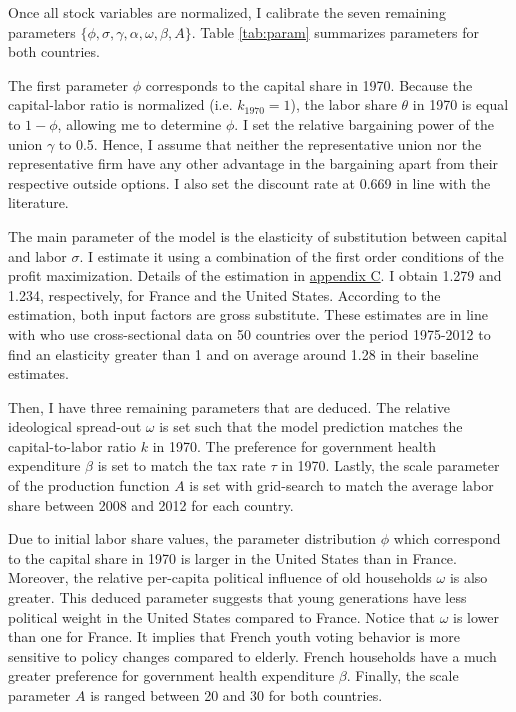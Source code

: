 Once all stock variables are normalized, I calibrate the seven remaining parameters $\lbrace \phi, \sigma, \gamma, \alpha, \omega, \beta, A \rbrace$. Table \ref{tab:param} summarizes parameters for both countries.

The first parameter $\phi$ corresponds to the capital share in 1970. Because the capital-labor ratio is normalized (i.e. $k_{1970} = 1$), the labor share $\theta$ in 1970 is equal to $1-\phi$, allowing me to determine $\phi$. I set the relative bargaining power of the union $\gamma$ to 0.5. Hence, I assume that neither the representative union nor the representative firm have any other advantage in the bargaining apart from their respective outside options. I also set the discount rate at 0.669 in line with the literature.

The main parameter of the model is the elasticity of substitution between capital and labor $\sigma$. I estimate it using a combination of the first order conditions of the profit maximization. Details of the estimation in \hyperref[appendix:sigma]{appendix C}. I obtain 1.279 and 1.234, respectively, for France and the United States. According to the estimation, both input factors are gross substitute. These estimates are in line with \cite{Karabarbounis2014} who use cross-sectional data on 50 countries over the period 1975-2012 to find an elasticity greater than 1 and on average around 1.28 in their baseline estimates. 

Then, I have three remaining parameters that are deduced. The relative ideological spread-out $\omega$ is set such that the model prediction matches the capital-to-labor ratio $k$ in 1970. The preference for government health expenditure $\beta$ is set to match the tax rate $\tau$ in 1970. Lastly, the scale parameter of the production function $A$ is set with grid-search to match the average labor share between 2008 and 2012 for each country.

Due to initial labor share values, the parameter distribution $\phi$ which correspond to the capital share in 1970 is larger in the United States than in France. Moreover, the relative per-capita political influence of old households $\omega$ is also greater. This deduced parameter suggests that young generations have less political weight in the United States compared to France. Notice that $\omega$ is lower than one for France. It implies that French youth voting behavior is more sensitive to policy changes compared to elderly. French households have a much greater preference for government health expenditure $\beta$. Finally, the scale parameter $A$ is ranged between 20 and 30 for both countries.

